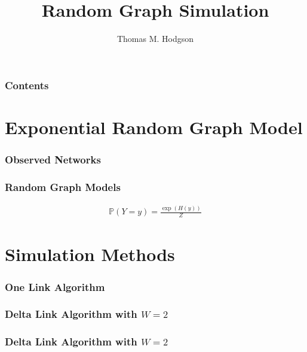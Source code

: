 \documentclass[11pt]{beamer}
\begin{document}
    \author{Thomas M. Hodgson}
    \title{Random Graph Simulation}
    \begin{frame}[plain]
    \maketitle
\end{frame}

\begin{frame}
\frametitle{Contents}
\tableofcontents
\end{frame}
\section[ERGM]{Exponential Random Graph Model}
\begin{frame}
\frametitle{Observed Networks}
\begin{figure}
\centering
\end{figure}
\end{frame}

\begin{frame}
\frametitle{Random Graph Models}
\begin{align*}\mathbb{P}(Y=y) = \frac{\exp(H(y))}{Z}\end{align*}
\end{frame}


\section[Simulation Methods]{Simulation Methods}
\begin{frame}
\frametitle{One Link Algorithm}
\begin{figure}
    \centering
\end{figure}
\end{frame}

\begin{frame}
\frametitle{Delta Link Algorithm with \(W=2\)}
\begin{figure}
    \centering
\end{figure}
\end{frame}

\begin{frame}

\frametitle{Delta Link Algorithm with \(W=2\)}
\begin{figure}
    \centering
\end{figure}
\end{frame}
\end{document}

